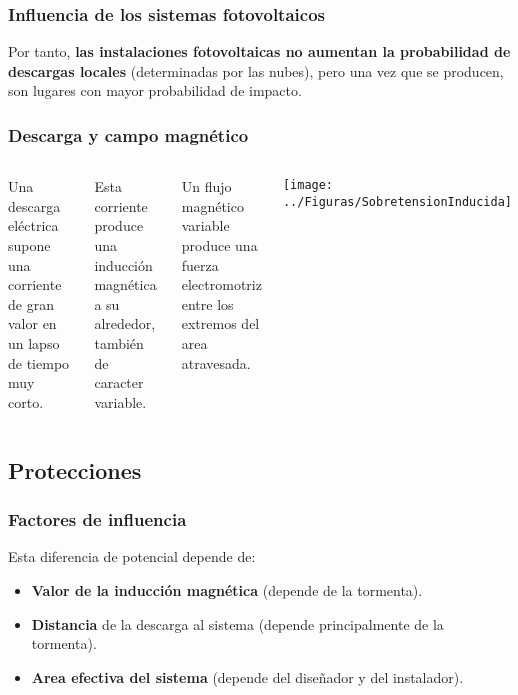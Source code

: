 \documentclass[serif, xcolor=dvipsnames]{beamer}
\begin{document}
\begin{frame}
\frametitle{Influencia de los sistemas fotovoltaicos}
\begin{block}
{}

Por tanto,\textbf{ las instalaciones fotovoltaicas no aumentan la
probabilidad de descargas locales} (determinadas por las nubes), pero
una vez que se producen, son lugares con mayor probabilidad de impacto.

\end{block}

\end{frame}

\begin{frame}
\frametitle{Descarga y campo magnético}
\begin{columns}[c]%


\column{6cm}

Una descarga eléctrica supone una corriente de gran valor en un lapso
de tiempo muy corto.

Esta corriente produce una inducción magnética a su alrededor, también
de caracter variable. 

Un flujo magnético variable produce una fuerza electromotriz entre
los extremos del area atravesada.


\column{5cm}

\begin{center}
\texttt{[image: ../Figuras/SobretensionInducida]}
\par\end{center}

\end{columns}%

\end{frame}

\subsection{Protecciones}


\begin{frame}
\frametitle{Factores de influencia}
\begin{block}
{}

Esta diferencia de potencial depende de:
\begin{itemize}
\item \textbf{Valor de la inducción magnética} (depende de la tormenta).
\item \textbf{Distancia} de la descarga al sistema (depende principalmente
de la tormenta).
\item \textbf{Area efectiva del sistema} (depende del diseñador y del instalador).
\end{itemize}
\end{block}

\end{frame}
\end{document}
